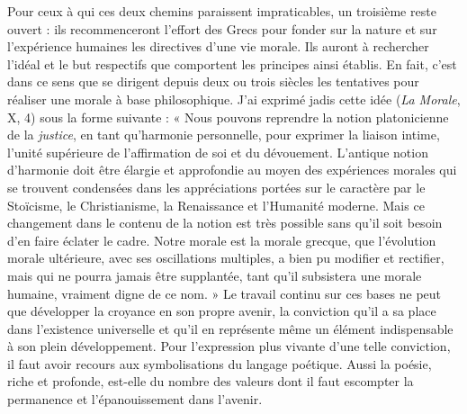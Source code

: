 \documentclass[12pt,a4paper]{article}
\begin{document}
Pour ceux à qui ces deux chemins paraissent impraticables, un
troisième reste ouvert : ils recommenceront l'effort des Grecs pour
fonder sur la nature et sur l'expérience humaines les directives
d'une vie morale. Ils auront à rechercher l'idéal et le but respectifs
que comportent les principes ainsi établis. En fait, c'est dans ce
sens que se dirigent depuis deux ou trois siècles les tentatives pour
réaliser une morale à base philosophique. J'ai exprimé jadis cette
idée (\emph{La Morale}, X, 4) sous la forme suivante : « Nous pouvons
reprendre la notion platonicienne de la \emph{justice}, en tant qu'harmonie
personnelle, pour exprimer la liaison intime, l'unité supérieure
de l'affirmation de soi et du dévouement. L'antique notion d'harmonie
doit être élargie et approfondie au moyen des expériences
morales qui se trouvent condensées dans les appréciations portées
sur le caractère par le Stoïcisme, le Christianisme, la Renaissance
et l'Humanité moderne. Mais ce changement dans le contenu de la
notion est très possible sans qu'il soit besoin d'en faire éclater le
cadre. Notre morale est la morale grecque, que l'évolution morale
ultérieure, avec ses oscillations multiples, a bien pu modifier et
rectifier, mais qui ne pourra jamais être supplantée, tant qu'il subsistera
une morale humaine, vraiment digne de ce nom. » Le travail
continu sur ces bases ne peut que développer la croyance en son
propre avenir, la conviction qu'il a sa place dans l'existence universelle
et qu'il en représente même un élément indispensable à son
plein développement. Pour l'expression plus vivante d'une telle conviction,
il faut avoir recours aux symbolisations du langage poétique.
Aussi la poésie, riche et profonde, est-elle du nombre des
valeurs dont il faut escompter la permanence et l'épanouissement
dans l'avenir.
\end{document}
